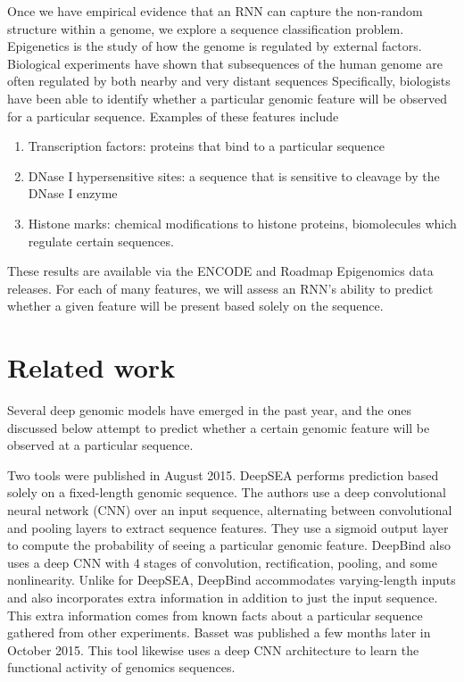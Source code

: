 \documentclass{article} %
\begin{document}
Once we have empirical evidence that an RNN can capture the non-random structure within a genome, we explore a sequence classification problem. Epigenetics is the study of how the genome is regulated by external factors. Biological experiments have shown that subsequences of the human genome are often regulated by both nearby and very distant sequences Specifically, biologists have been able to identify whether a particular genomic feature will be observed for a particular sequence. Examples of these features include
\begin{enumerate}
	\item Transcription factors: proteins that bind to a particular sequence
	\item DNase I hypersensitive sites: a sequence that is sensitive to cleavage by the DNase I enzyme
	\item Histone marks: chemical modifications to histone proteins, biomolecules  which regulate certain sequences.
\end{enumerate}

These results are available via the ENCODE and Roadmap Epigenomics data releases. For each of many features, we will assess an RNN's ability to predict whether a given feature will be present based solely on the sequence.

\section{Related work}

Several deep genomic models have emerged in the past year, and the ones discussed below attempt to predict whether a certain genomic feature will be observed at a particular sequence.

Two tools were published in August 2015. DeepSEA \cite{zhou2015predicting} performs prediction based solely on a fixed-length genomic sequence. The authors use a deep convolutional neural network (CNN) over an input sequence, alternating between convolutional and pooling layers to extract sequence features. They use a sigmoid output layer to compute the probability of seeing a particular genomic feature. DeepBind \cite{alipanahi2015predicting} also uses a deep CNN with 4 stages of convolution, rectification, pooling, and some nonlinearity. Unlike for DeepSEA, DeepBind accommodates varying-length inputs and also incorporates extra information in addition to just the input sequence. This extra information comes from known facts about a particular sequence gathered from other experiments. Basset \cite{kelley2015basset} was published a few months later in October 2015. This tool likewise uses a deep CNN architecture to learn the functional activity of genomics sequences.
\end{document}
